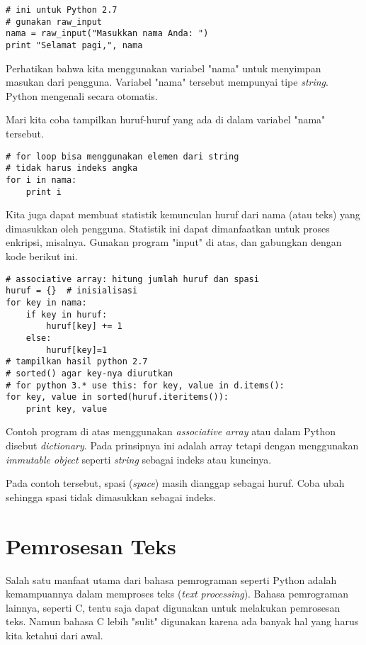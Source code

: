 \begin{verbatim}
# ini untuk Python 2.7
# gunakan raw_input
nama = raw_input("Masukkan nama Anda: ")
print "Selamat pagi,", nama
\end{verbatim}

Perhatikan bahwa kita menggunakan variabel "nama" untuk menyimpan masukan
dari pengguna. Variabel "nama" tersebut mempunyai tipe {\em string}.
Python mengenali secara otomatis.

Mari kita coba tampilkan huruf-huruf yang ada di dalam variabel "nama"
tersebut.

\begin{verbatim}
# for loop bisa menggunakan elemen dari string
# tidak harus indeks angka
for i in nama:
    print i
\end{verbatim}

Kita juga dapat membuat statistik kemunculan huruf dari nama (atau teks)
yang dimasukkan oleh pengguna. Statistik ini dapat dimanfaatkan untuk
proses enkripsi, misalnya. Gunakan program "input" di atas, dan gabungkan
dengan kode berikut ini.

\begin{verbatim}
# associative array: hitung jumlah huruf dan spasi
huruf = {}  # inisialisasi
for key in nama:
    if key in huruf:
        huruf[key] += 1
    else:
        huruf[key]=1
# tampilkan hasil python 2.7
# sorted() agar key-nya diurutkan
# for python 3.* use this: for key, value in d.items():
for key, value in sorted(huruf.iteritems()):
    print key, value
\end{verbatim}

Contoh program di atas menggunakan {\em associative array} atau dalam
Python disebut {\em dictionary}. Pada prinsipnya ini adalah array tetapi
dengan menggunakan {\em immutable object} seperti {\em string} sebagai
indeks atau kuncinya.

Pada contoh tersebut, spasi ({\em space}) masih dianggap sebagai huruf.
Coba ubah sehingga spasi tidak dimasukkan sebagai indeks.


\section{Pemrosesan Teks}
Salah satu manfaat utama dari bahasa pemrograman seperti Python adalah
kemampuannya dalam memproses teks ({\em text processing}). Bahasa
pemrograman lainnya, seperti C, tentu saja dapat digunakan untuk melakukan
pemrosesan teks. Namun bahasa C lebih "sulit" digunakan karena ada banyak
hal yang harus kita ketahui dari awal.


